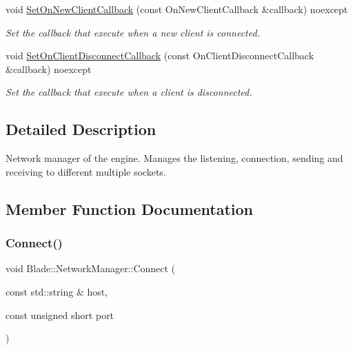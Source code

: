 \begin{DoxyCompactItemize}
void \hyperlink{class_blade_1_1_network_manager_a192f822f26e76829c2414f1505418a78}{Set\+On\+New\+Client\+Callback} (const On\+New\+Client\+Callback \&callback) noexcept
\begin{DoxyCompactList}\small\item\em Set the callback that execute when a new client is connected. \end{DoxyCompactList}\item 
void \hyperlink{class_blade_1_1_network_manager_ada4cd3f291d3775e7467c5be31090a99}{Set\+On\+Client\+Disconnect\+Callback} (const On\+Client\+Disconnect\+Callback \&callback) noexcept
\begin{DoxyCompactList}\small\item\em Set the callback that execute when a client is disconnected. \end{DoxyCompactList}\end{DoxyCompactItemize}


\subsection{Detailed Description}
Network manager of the engine. Manages the listening, connection, sending and receiving to different multiple sockets. 

\subsection{Member Function Documentation}
\mbox{\label{class_blade_1_1_network_manager_a61a872d6eec9050280dc041a7cda3759}} 
\subsubsection{\texorpdfstring{Connect()}{Connect()}}
{\footnotesize\ttfamily void Blade\+::\+Network\+Manager\+::\+Connect (\begin{DoxyParamCaption}\item[{const std\+::string \&}]{host,  }\item[{const unsigned short}]{port }\end{DoxyParamCaption})\hspace{0.3cm}{\ttfamily [noexcept]}}



